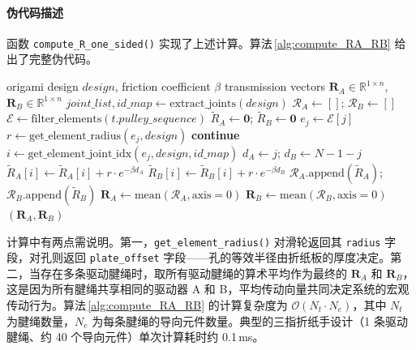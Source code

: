 \paragraph{伪代码描述}

函数 \texttt{compute\_R\_one\_sided()} 实现了上述计算。算法\,\ref{alg:compute_RA_RB} 给出了完整伪代码。

\begin{algorithm}[htbp]
\caption{单侧传动矩阵 $\mathbf{R}_A$ 与 $\mathbf{R}_B$ 的计算}
\label{alg:compute_RA_RB}
\begin{algorithmic}[1]
\Require origami design $design$, friction coefficient $\beta$
\Ensure transmission vectors $\mathbf{R}_A \in \mathbb{R}^{1 \times n}$, $\mathbf{R}_B \in \mathbb{R}^{1 \times n}$
\State $joint\_list, id\_map \gets \text{extract\_joints}(design)$
\State $\mathcal{R}_A \gets []$; $\mathcal{R}_B \gets []$
    \State $\mathcal{E} \gets \text{filter\_elements}(t.pulley\_sequence)$
    \State $\tilde R_A \gets \mathbf{0}$; $\tilde R_B \gets \mathbf{0}$
        \State $e_j \gets \mathcal{E}[j]$
        \State $r \gets \text{get\_element\_radius}(e_j, design)$
         \textbf{continue} \EndIf
        \State $i \gets \text{get\_element\_joint\_idx}(e_j, design, id\_map)$
            \State $d_A \gets j$; $d_B \gets N-1-j$
            \State $\tilde R_A[i] \gets \tilde R_A[i] + r \cdot e^{-\beta d_A}$
            \State $\tilde R_B[i] \gets \tilde R_B[i] + r \cdot e^{-\beta d_B}$
        \EndIf
    \EndFor
    \State $\mathcal{R}_A.\text{append}(\tilde R_A)$; $\mathcal{R}_B.\text{append}(\tilde R_B)$
\EndFor
\State $\mathbf{R}_A \gets \text{mean}(\mathcal{R}_A, \text{axis}=0)$
\State $\mathbf{R}_B \gets \text{mean}(\mathcal{R}_B, \text{axis}=0)$
\State \Return $(\mathbf{R}_A, \mathbf{R}_B)$
\end{algorithmic}
\end{algorithm}

计算中有两点需说明。第一，\texttt{get\_element\_radius()} 对滑轮返回其 \texttt{radius} 字段，对孔则返回 \texttt{plate\_offset} 字段——孔的等效半径由折纸板的厚度决定。第二，当存在多条驱动腱绳时，取所有驱动腱绳的算术平均作为最终的 $\mathbf{R}_A$ 和 $\mathbf{R}_B$，这是因为所有腱绳共享相同的驱动器 A 和 B，平均传动向量共同决定系统的宏观传动行为。算法\,\ref{alg:compute_RA_RB} 的计算复杂度为 $\mathcal{O}(N_t \cdot N_e)$，其中 $N_t$ 为腱绳数量，$N_e$ 为每条腱绳的导向元件数量。典型的三指折纸手设计（1 条驱动腱绳、约 40 个导向元件）单次计算耗时约 0.1\,ms。

